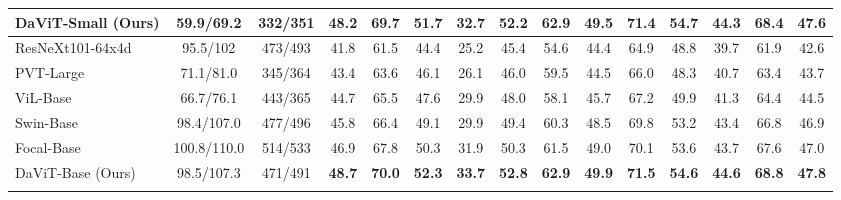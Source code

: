\documentclass[runningheads]{llncs}
\newcommand{\modelInTable}{DaViT\xspace}
\newlength\savewidth
\newcommand\shline{\noalign{\global\savewidth\arrayrulewidth
  \global\arrayrulewidth 1pt}\hline\noalign{\global\arrayrulewidth\savewidth}}
\begin{document}
\begin{table*}[t]
\begin{center}
{\begin{tabular}{l|cc|cccccc|cccccc}
\rowcolor{Gray}
\modelInTable-Small (Ours) & 59.9/69.2 & 332/351 & \textbf{48.2} & \textbf{69.7} & \textbf{51.7} & \textbf{32.7} & \textbf{52.2} & \textbf{62.9} & \textbf{49.5} & \textbf{71.4} & \textbf{54.7} & \textbf{44.3} & \textbf{68.4} & \textbf{47.6} \\
\hline
ResNeXt101-64x4d~\cite{xie2017aggregated} & 95.5/102 & 473/493 & 41.8 & 61.5 & 44.4 & 25.2 & 45.4 & 54.6 & 44.4 & 64.9 & 48.8 & 39.7 & 61.9 & 42.6 \\
PVT-Large\cite{wang2021pyramid} & 71.1/81.0 & 345/364 & 43.4 & 63.6 & 46.1 & 26.1 & 46.0 & 59.5 & 44.5 & 66.0 & 48.3 & 40.7 & 63.4 & 43.7 \\
ViL-Base~\cite{zhang2021multi} & 66.7/76.1 & 443/365 & 44.7 & 65.5 & 47.6 & 29.9 & 48.0 & 58.1 & 45.7 & 67.2 & 49.9 & 41.3 & 64.4 & 44.5 \\
Swin-Base~\cite{liu2021swin} & 98.4/107.0 & 477/496 & 45.8 & 66.4 & 49.1 & 29.9 & 49.4 & 60.3 & 48.5 & 69.8 & 53.2 & 43.4 & 66.8 & 46.9 \\
Focal-Base~\cite{yang2021focal} & 100.8/110.0 & 514/533 & {46.9} & {67.8} & {50.3} & {31.9} & {50.3} & {61.5} & {49.0} & {70.1} & {53.6} & {43.7} & {67.6} & {47.0} \\
\rowcolor{Gray}
\modelInTable-Base (Ours) & 98.5/107.3 & 471/491 & \textbf{48.7} & \textbf{70.0} & \textbf{52.3} & \textbf{33.7} & \textbf{52.8} & \textbf{62.9} & \textbf{49.9} & \textbf{71.5} & \textbf{54.6} & \textbf{44.6} & \textbf{68.8} & \textbf{47.8} \\
\shline
\end{tabular}}
\end{center}
\label{tab:object_detection_3x}
\vspace{-8pt}
\end{table*}
\end{document}
